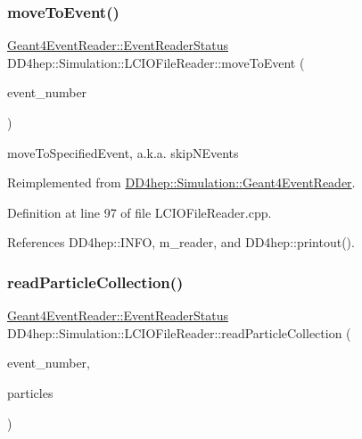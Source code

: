 \subsubsection{\texorpdfstring{move\+To\+Event()}{moveToEvent()}}
{\footnotesize\ttfamily \hyperlink{class_d_d4hep_1_1_simulation_1_1_geant4_event_reader_ae4f4bc83ffcf5b0c1868ad78859851e7}{Geant4\+Event\+Reader\+::\+Event\+Reader\+Status} D\+D4hep\+::\+Simulation\+::\+L\+C\+I\+O\+File\+Reader\+::move\+To\+Event (\begin{DoxyParamCaption}\item[{int}]{event\+\_\+number }\end{DoxyParamCaption})\hspace{0.3cm}{\ttfamily [virtual]}}



move\+To\+Specified\+Event, a.\+k.\+a. skip\+N\+Events 



Reimplemented from \hyperlink{class_d_d4hep_1_1_simulation_1_1_geant4_event_reader_a0b6d2fe12ae259534cbe7a5b6e35b642}{D\+D4hep\+::\+Simulation\+::\+Geant4\+Event\+Reader}.



Definition at line 97 of file L\+C\+I\+O\+File\+Reader.\+cpp.



References D\+D4hep\+::\+I\+N\+FO, m\+\_\+reader, and D\+D4hep\+::printout().

\hypertarget{class_d_d4hep_1_1_simulation_1_1_l_c_i_o_file_reader_a4163f75ac06423136ab2c3e806713b83}{}\label{class_d_d4hep_1_1_simulation_1_1_l_c_i_o_file_reader_a4163f75ac06423136ab2c3e806713b83} 
\subsubsection{\texorpdfstring{read\+Particle\+Collection()}{readParticleCollection()}}
{\footnotesize\ttfamily \hyperlink{class_d_d4hep_1_1_simulation_1_1_geant4_event_reader_ae4f4bc83ffcf5b0c1868ad78859851e7}{Geant4\+Event\+Reader\+::\+Event\+Reader\+Status} D\+D4hep\+::\+Simulation\+::\+L\+C\+I\+O\+File\+Reader\+::read\+Particle\+Collection (\begin{DoxyParamCaption}\item[{int}]{event\+\_\+number,  }\item[{E\+V\+E\+N\+T\+::\+L\+C\+Collection $\ast$$\ast$}]{particles }\end{DoxyParamCaption})\hspace{0.3cm}{\ttfamily [virtual]}}



